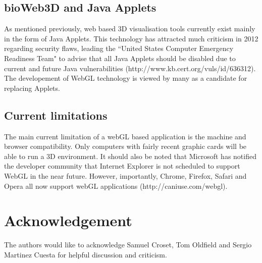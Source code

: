 \documentclass{bioinfo}
\begin{document}
	\subsection{bioWeb3D and Java Applets}
As mentioned previously, web based 3D visualisation tools currently exist mainly in the form of Java Applets. This technology has attracted much criticism in 2012 regarding security flaws, leading the ``United States Computer Emergency Readiness Team" to advise that all Java Applets should be disabled due to current and future Java vulnerabilities (http://www.kb.cert.org/vuls/id/636312). The developement of WebGL technology is viewed by many as a candidate for replacing Applets. 

	\subsection{Current limitations}
The main current limitation of a webGL based application is the machine and browser compatibility. Only computers with fairly recent graphic cards will be able to run a 3D environment. It should also be noted that Microsoft has notified the developer community that Internet Explorer is not scheduled to support WebGL in the near future. However, importantly, Chrome, Firefox, Safari and Opera all now support webGL applications (http://caniuse.com/webgl).



\section*{Acknowledgement}
The authors would like to acknowledge Samuel Croset, Tom Oldfield and Sergio Martinez Cuesta for helpful discussion and criticism.

%
%
%
%
%

%

%
\end{document}
